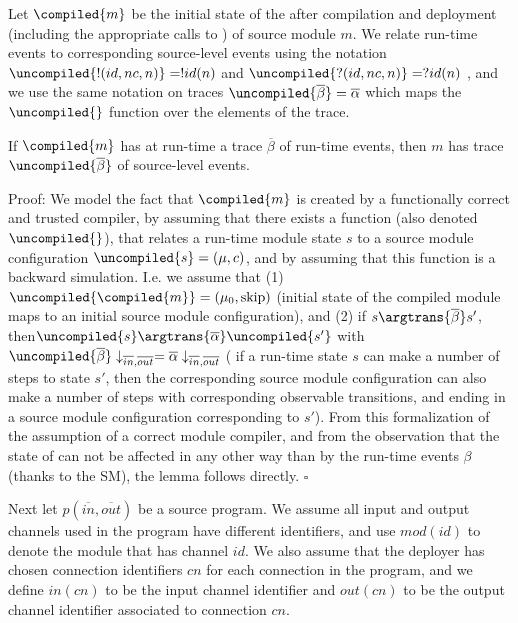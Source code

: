 Let $\compiled{m}$ be the initial state of the \protmod{} after compilation and deployment (including the appropriate calls to \setkey) of source module $m$.
We relate run-time events to corresponding source-level events using the notation $\uncompiled{!(id,nc,n) } = !id(n)$  and $\uncompiled{?(id,nc,n)} = ?id(n)$ ,
and we use the same notation on traces $\uncompiled{\overline{\beta}} = \overline{\alpha}$ which maps the $\uncompiled{}$ function over the elements of the trace.

\begin{lemma} \label{lem:mod2}
If $\compiled{m}$ has at run-time a trace $\overline{\beta}$ of run-time events, then $m$ has trace $\uncompiled{\overline{\beta}}$ of source-level events.
\end{lemma}

Proof:
We model the fact that $\compiled{m}$ is created by a functionally correct and trusted compiler, by assuming that there exists a function (also denoted $\uncompiled{}$), that
relates a run-time module state $s$ to a source module configuration $\uncompiled{s} = (\mu,c)$, and by assuming that this function is a backward simulation.
I.e. we assume that (1)  $\uncompiled{\compiled{m}} = (\mu_0,\mathrm{skip})$ (initial state of the compiled module maps to an initial source module configuration), and (2) if
$s \argtrans{\overline{\beta}} s'$, then$\uncompiled{s} \argtrans{\overline{\alpha}} \uncompiled{s'}$ with $\uncompiled{\overline{\beta}} \downarrow_{\overline{in},\overline{out}}
= \overline{\alpha}  \downarrow_{\overline{in},\overline{out}}$ ( if a run-time state $s$ can make a number of steps to state $s'$, then the corresponding source module configuration can
also make a number of steps with corresponding observable transitions, and ending in a source module configuration corresponding to $s'$).
From this formalization of the assumption of a correct module compiler, and
from the observation that the state of \protmods{} can not be affected in any other way than
by the run-time events $\beta$ (thanks to the \ac{SM}), the lemma follows directly. \hfill $\square$

Next let $p(\overline{in},\overline{out})$ be a source program. We assume all input and output channels used in the program have different identifiers, and use $mod(id)$ to
denote the module that has channel $id$. We also assume
that the deployer has chosen connection identifiers $cn$ for each connection in the program, and we define $in(cn)$ to be the input channel identifier and $out(cn)$ to be
the output channel identifier associated to connection $cn$. 


